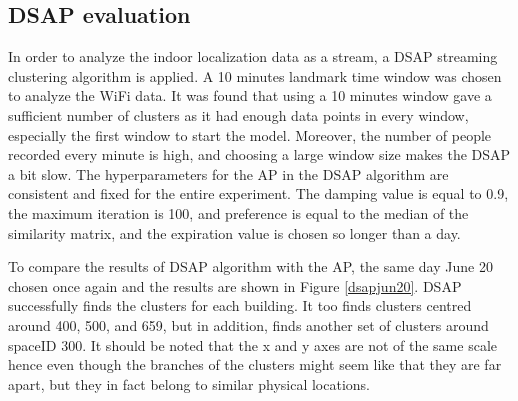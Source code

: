 \subsection{DSAP evaluation}
In order to analyze the indoor localization data as a stream, a DSAP streaming clustering algorithm is applied. A 10 minutes landmark time window was chosen to analyze the WiFi data. It was found that using a 10 minutes window gave a sufficient number of clusters as it had enough data points in every window, especially the first window to start the model. Moreover, the number of people recorded every minute is high, and choosing a large window size makes the DSAP a bit slow. The hyperparameters for the AP in the DSAP algorithm are consistent and fixed for the entire experiment. The damping value is equal to 0.9, the maximum iteration is 100, and preference is equal to the median of the similarity matrix, and the expiration value is chosen so longer than a day. 

To compare the results of DSAP algorithm with the AP, the same day June 20 chosen once again and the results are shown in Figure \ref{dsapjun20}. DSAP successfully finds the clusters for each building. It too finds clusters centred around 400, 500, and 659, but in addition, finds another set of clusters around spaceID 300. It should be noted that the x and y axes are not of the same scale hence even though the branches of the clusters might seem like that they are far apart, but they in fact belong to similar physical locations.

